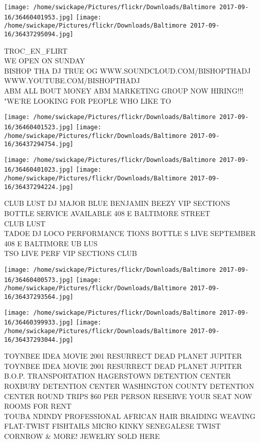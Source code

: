 \documentclass[10pt,letterpaper]{article}
\begin{document}
\texttt{[image: /home/swickape/Pictures/flickr/Downloads/Baltimore 2017-09-16/36460401953.jpg]}
\texttt{[image: /home/swickape/Pictures/flickr/Downloads/Baltimore 2017-09-16/36437295094.jpg]}

TROC\_EN\_FLIRT\\
WE OPEN ON SUNDAY\\
BISHOP THA DJ TRUE OG WWW.SOUNDCLOUD.COM/BISHOPTHADJ WWW.YOUTUBE.COM/BISHOPTHADJ\\
ABM ALL BOUT MONEY ABM MARKETING GROUP NOW HIRING!!! "WE'RE LOOKING FOR PEOPLE WHO LIKE TO
\pagebreak

\texttt{[image: /home/swickape/Pictures/flickr/Downloads/Baltimore 2017-09-16/36460401523.jpg]}
\texttt{[image: /home/swickape/Pictures/flickr/Downloads/Baltimore 2017-09-16/36437294754.jpg]}

\texttt{[image: /home/swickape/Pictures/flickr/Downloads/Baltimore 2017-09-16/36460401023.jpg]}
\texttt{[image: /home/swickape/Pictures/flickr/Downloads/Baltimore 2017-09-16/36437294224.jpg]}

CLUB LUST DJ MAJOR BLUE BENJAMIN BEEZY VIP SECTIONS BOTTLE SERVICE AVAILABLE 408 E BALTIMORE STREET\\
CLUB LUST\\
TADOE DJ LOCO PERFORMANCE TIONS BOTTLE S LIVE SEPTEMBER 408 E BALTIMORE UB LUS\\
TSO LIVE PERF VIP SECTIONS CLUB
\pagebreak

\texttt{[image: /home/swickape/Pictures/flickr/Downloads/Baltimore 2017-09-16/36460400573.jpg]}
\texttt{[image: /home/swickape/Pictures/flickr/Downloads/Baltimore 2017-09-16/36437293564.jpg]}

\texttt{[image: /home/swickape/Pictures/flickr/Downloads/Baltimore 2017-09-16/36460399933.jpg]}
\texttt{[image: /home/swickape/Pictures/flickr/Downloads/Baltimore 2017-09-16/36437293044.jpg]}

TOYNBEE IDEA MOVIE 2001 RESURRECT DEAD PLANET JUPITER TOYNBEE IDEA MOVIE 2001 RESURRECT DEAD PLANET JUPITER\\
B.O.P. TRANSPORTATION HAGERSTOWN DETENTION CENTER ROXBURY DETENTION CENTER WASHINGTON COUNTY DETENTION CENTER ROUND TRIPS \$60 PER PERSON RESERVE YOUR SEAT NOW\\
ROOMS FOR RENT\\
TOUBA NDINDY PROFESSIONAL AFRICAN HAIR BRAIDING WEAVING FLAT{-}TWIST FISHTAILS MICRO KINKY SENEGALESE TWIST CORNROW \& MORE!  JEWELRY SOLD HERE
\pagebreak
\end{document}
